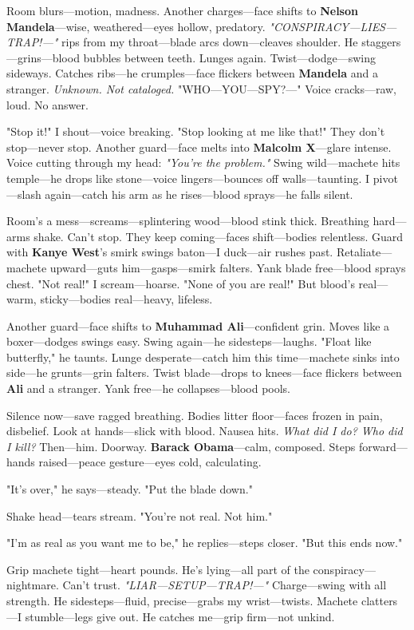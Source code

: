\documentclass{article}
\begin{document}
Room blurs—motion, madness. Another charges—face shifts to \textbf{Nelson Mandela}—wise, weathered—eyes hollow, predatory. \textit{"CONSPIRACY—LIES—TRAP!—"} rips from my throat—blade arcs down—cleaves shoulder. He staggers—grins—blood bubbles between teeth. Lunges again. Twist—dodge—swing sideways. Catches ribs—he crumples—face flickers between \textbf{Mandela} and a stranger. \textit{Unknown. Not cataloged.} "WHO—YOU—SPY?—" Voice cracks—raw, loud. No answer.

"Stop it!" I shout—voice breaking. "Stop looking at me like that!" They don’t stop—never stop. Another guard—face melts into \textbf{Malcolm X}—glare intense. Voice cutting through my head: \textit{"You’re the problem."} Swing wild—machete hits temple—he drops like stone—voice lingers—bounces off walls—taunting. I pivot—slash again—catch his arm as he rises—blood sprays—he falls silent.

Room’s a mess—screams—splintering wood—blood stink thick. Breathing hard—arms shake. Can’t stop. They keep coming—faces shift—bodies relentless. Guard with \textbf{Kanye West}’s smirk swings baton—I duck—air rushes past. Retaliate—machete upward—guts him—gasps—smirk falters. Yank blade free—blood sprays chest. "Not real!" I scream—hoarse. "None of you are real!" But blood’s real—warm, sticky—bodies real—heavy, lifeless.

Another guard—face shifts to \textbf{Muhammad Ali}—confident grin. Moves like a boxer—dodges swings easy. Swing again—he sidesteps—laughs. "Float like butterfly," he taunts. Lunge desperate—catch him this time—machete sinks into side—he grunts—grin falters. Twist blade—drops to knees—face flickers between \textbf{Ali} and a stranger. Yank free—he collapses—blood pools.

Silence now—save ragged breathing. Bodies litter floor—faces frozen in pain, disbelief. Look at hands—slick with blood. Nausea hits. \textit{What did I do? Who did I kill?} Then—him. Doorway. \textbf{Barack Obama}—calm, composed. Steps forward—hands raised—peace gesture—eyes cold, calculating.

"It’s over," he says—steady. "Put the blade down."

Shake head—tears stream. "You’re not real. Not him."

"I’m as real as you want me to be," he replies—steps closer. "But this ends now."

Grip machete tight—heart pounds. He’s lying—all part of the conspiracy—nightmare. Can’t trust. \textit{"LIAR—SETUP—TRAP!—"} Charge—swing with all strength. He sidesteps—fluid, precise—grabs my wrist—twists. Machete clatters—I stumble—legs give out. He catches me—grip firm—not unkind.
\end{document}
